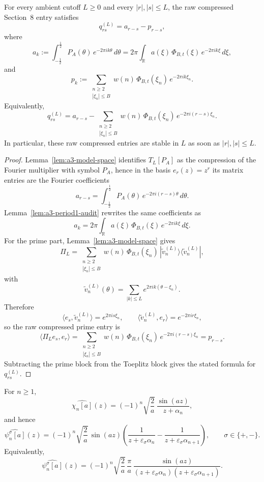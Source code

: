 \begin{proposition}\label{prop:H1-raw-q-formula}
For every ambient cutoff $L\ge 0$ and every $|r|,|s|\le L$, the raw compressed
Section~8 entry satisfies
\[
  q_{rs}^{(L)}=a_{r-s}-p_{r-s},
\]
where
\[
  a_k
  :=
  \int_{-\tfrac12}^{\tfrac12} P_A(\theta)\,e^{-2\pi i k\theta}\,d\theta
  =
  2\pi\int_{\mathbb R} a(\xi)\,\Phi_{B,t}(\xi)\,e^{-2\pi i k\xi}\,d\xi,
\]
and
\[
  p_k
  :=
  \sum_{\substack{n\ge2\\ |\xi_n|\le B}}
  w(n)\,\Phi_{B,t}(\xi_n)\,e^{-2\pi i k\xi_n}.
\]
Equivalently,
\[
  q_{rs}^{(L)}
  =
  a_{r-s}
  -
  \sum_{\substack{n\ge2\\ |\xi_n|\le B}}
  w(n)\,\Phi_{B,t}(\xi_n)\,e^{-2\pi i(r-s)\xi_n}.
\]
In particular, these raw compressed entries are stable in $L$ as soon as
$|r|,|s|\le L$.
\end{proposition}

\begin{proof}
Lemma~\ref{lem:a3-model-space} identifies $T_L[P_A]$ as the compression of the
Fourier multiplier with symbol $P_A$, hence in the basis $e_r(z)=z^r$ its
matrix entries are the Fourier coefficients
\[
  a_{r-s}
  =
  \int_{-\tfrac12}^{\tfrac12} P_A(\theta)\,e^{-2\pi i(r-s)\theta}\,d\theta.
\]
Lemma~\ref{lem:a3-period1-audit} rewrites the same coefficients as
\[
  a_k
  =
  2\pi\int_{\mathbb R} a(\xi)\,\Phi_{B,t}(\xi)\,e^{-2\pi i k\xi}\,d\xi.
\]
For the prime part, Lemma~\ref{lem:a3-model-space} gives
\[
  \Pi_L
  =
  \sum_{\substack{n\ge2\\ |\xi_n|\le B}}
  w(n)\,\Phi_{B,t}(\xi_n)\,|\tilde v_n^{(L)}\rangle\!\langle \tilde v_n^{(L)}|,
\]
with
\[
  \tilde v_n^{(L)}(\theta)=\sum_{|k|\le L}e^{2\pi i k(\theta-\xi_n)}.
\]
Therefore
\[
  \langle e_s,\tilde v_n^{(L)}\rangle
  =
  e^{2\pi i s\xi_n},
  \qquad
  \langle \tilde v_n^{(L)},e_r\rangle
  =
  e^{-2\pi i r\xi_n},
\]
so the raw compressed prime entry is
\[
  \langle \Pi_L e_s,e_r\rangle
  =
  \sum_{\substack{n\ge2\\ |\xi_n|\le B}}
  w(n)\,\Phi_{B,t}(\xi_n)\,e^{-2\pi i(r-s)\xi_n}
  =
  p_{r-s}.
\]
Subtracting the prime block from the Toeplitz block gives the stated formula
for $q_{rs}^{(L)}$.
\end{proof}

\begin{lemma}\label{lem:H1-adjacent-fourier}
For $n\ge 1$,
\[
  \widehat{\chi_n[a]}(z)
  =
  (-1)^n\sqrt{\frac2a}\,\frac{\sin(az)}{z+\alpha_n},
\]
and hence
\[
  \widehat{\psi_n^\sigma[a]}(z)
  =
  (-1)^n\sqrt{\frac2a}\,\sin(az)
  \left(
    \frac{1}{z+\varepsilon_\sigma\alpha_n}
    -
    \frac{1}{z+\varepsilon_\sigma\alpha_{n+1}}
  \right),
  \qquad
  \sigma\in\{+,-\}.
\]
Equivalently,
\[
  \widehat{\psi_n^\sigma[a]}(z)
  =
  (-1)^n\sqrt{\frac2a}\,\frac{\pi}{a}\,
  \frac{\sin(az)}
  {(z+\varepsilon_\sigma\alpha_n)(z+\varepsilon_\sigma\alpha_{n+1})}.
\]
\end{lemma}


